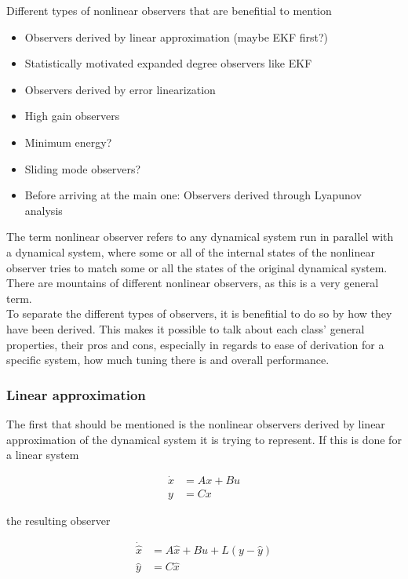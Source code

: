 Different types of nonlinear observers that are benefitial to mention

\begin{itemize}
    \item Observers derived by linear approximation (maybe EKF first?)
    \item Statistically motivated expanded degree observers like EKF
    \item Observers derived by error linearization
    \item High gain observers
    \item Minimum energy?
    \item Sliding mode observers?
    \item Before arriving at the main one: Observers derived through Lyapunov analysis
\end{itemize}
\fi

The term nonlinear observer refers to any dynamical system run in parallel with a dynamical system, where some or all of the internal states of the nonlinear observer tries to match some or all the states of the original dynamical system. There are mountains of different nonlinear observers, as this is a very general term. \\ 

To separate the different types of observers, it is benefitial to do so by how they have been derived. This makes it possible to talk about each class' general properties, their pros and cons, especially in regards to ease of derivation for a specific system, how much tuning there is and overall performance.

\subsubsection{Linear approximation}

The first that should be mentioned is the nonlinear observers derived by linear approximation of the dynamical system it is trying to represent\cite{LinearizingNonlinObs}. If this is done for a linear system 

\begin{align}
    \Dot{x} &= Ax + Bu \\
    y &= Cx
\end{align}

the resulting observer

\begin{align}
    \Dot{\hat{x}} &= A\hat{x} + Bu + L(y - \hat{y}) \\
    \hat{y} &= C\hat{x}
\end{align}


